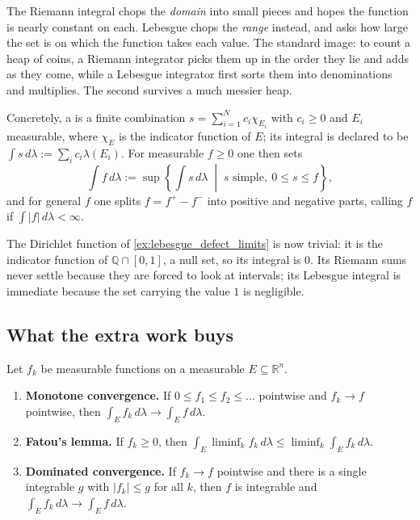 The Riemann integral chops the \emph{domain} into small pieces and hopes the function is nearly
constant on each. Lebesgue chops the \emph{range} instead, and asks how large the set is on which
the function takes each value. The standard image: to count a heap of coins, a Riemann integrator
picks them up in the order they lie and adds as they come, while a Lebesgue integrator first sorts
them into denominations and multiplies. The second survives a much messier heap.

Concretely, a  is a finite combination $s = \sum_{i=1}^N c_i \chi_{E_i}$
with $c_i \ge 0$ and $E_i$ measurable, where $\chi_E$ is the indicator function of $E$; its
integral is declared to be $\int s \,d\lambda := \sum_i c_i \lambda(E_i)$. For measurable
$f \ge 0$ one then sets
\[\int f \,d\lambda := \sup\left\{ \int s\,d\lambda \;\middle|\; s \text{ simple},\ 0 \le s \le f
\right\},\]
and for general $f$ one splits $f = f^+ - f^-$ into positive and negative parts, calling $f$
 if $\int\lvert f\rvert\,d\lambda < \infty$.

The Dirichlet function of \cref{ex:lebesgue_defect_limits} is now trivial: it is the indicator
function of $\mathbb{Q}\cap[0,1]$, a null set, so its integral is $0$. Its Riemann sums never
settle because they are forced to look at intervals; its Lebesgue integral is immediate because the
set carrying the value $1$ is negligible.

\subsection{What the extra work buys}

\begin{theorem}
\label{thm:lebesgue_convergence_theorems}
Let $f_k$ be measurable functions on a measurable $E \subseteq \mathbb{R}^n$.
\begin{enumerate}[label=\textbf{(\alph*)}]
  \item \textbf{Monotone convergence.} If $0 \le f_1 \le f_2 \le \dots$ pointwise and
    $f_k \to f$ pointwise, then $\int_E f_k\,d\lambda \to \int_E f\,d\lambda$.
  \item \textbf{Fatou's lemma.} If $f_k \ge 0$, then
    $\int_E \liminf_k f_k \,d\lambda \le \liminf_k \int_E f_k\,d\lambda$.
  \item \textbf{Dominated convergence.} If $f_k \to f$ pointwise and there is a single integrable
    $g$ with $\lvert f_k\rvert \le g$ for all $k$, then $f$ is integrable and
    $\int_E f_k\,d\lambda \to \int_E f\,d\lambda$.
\end{enumerate}
\end{theorem}

